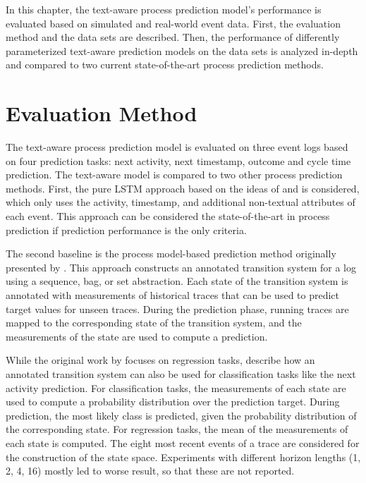 In this chapter, the text-aware process prediction model’s performance is evaluated based on simulated and real-world event data.
First, the evaluation method and the data sets are described.
Then, the performance of differently parameterized text-aware prediction models on the data sets is analyzed in-depth and compared to two current state-of-the-art process prediction methods.

\section{Evaluation Method}

The text-aware process prediction model is evaluated on three event logs based on four prediction tasks: next activity, next timestamp, outcome and cycle time prediction.
The text-aware model is compared to two other process prediction methods.
First, the pure LSTM approach based on the ideas of \citeauthor{DBLP:conf/caise/TaxVRD17} \cite{DBLP:conf/caise/TaxVRD17} and \citeauthor{DBLP:conf/ssci/NavarinVPS17} \cite{DBLP:conf/ssci/NavarinVPS17} is considered, which only uses the activity, timestamp, and additional non-textual attributes of each event.
This approach can be considered the state-of-the-art in process prediction if prediction performance is the only criteria.

The second baseline is the process model-based prediction method originally presented by \citeauthor{DBLP:journals/is/AalstSS11} \cite{DBLP:journals/is/AalstSS11}.
This approach constructs an annotated transition system for a log using a sequence, bag, or set abstraction.
Each state of the transition system is annotated with measurements of historical traces that can be used to predict target values for unseen traces.
During the prediction phase, running traces are mapped to the corresponding state of the transition system, and the measurements of the state are used to compute a prediction.

While the original work by \citeauthor{DBLP:journals/is/AalstSS11} focuses on regression tasks, \citeauthor{DBLP:journals/sosym/TaxTZ20} \cite{DBLP:journals/sosym/TaxTZ20} describe how an annotated transition system can also be used for classification tasks like the next activity prediction.
For classification tasks, the measurements of each state are used to compute a probability distribution over the prediction target.
During prediction, the most likely class is predicted, given the probability distribution of the corresponding state.
For regression tasks, the mean of the measurements of each state is computed.
The eight most recent events of a trace are considered for the construction of the state space.
Experiments with different horizon lengths (1, 2, 4, 16) mostly led to worse result, so that these are not reported.

